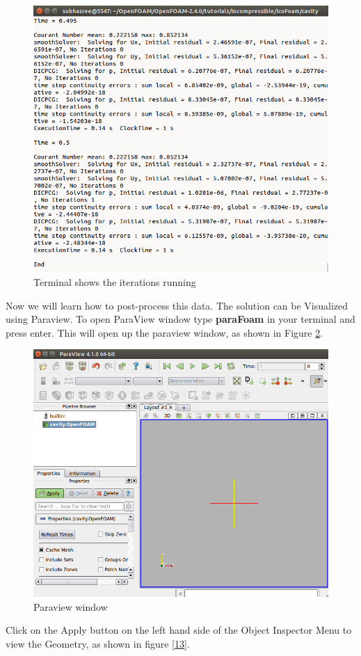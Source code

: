 \documentclass[a4paper,12pt]{report}
\begin{document}
\begin{figure}[ht]  
\begin{center}  
\includegraphics[scale=0.3]{11.png}
\caption{Terminal shows the iterations running}
\label{11}
\end{center}  
\end{figure}
\flushleft Now we will learn how to post-process this data. The solution can be Visualized using Paraview. To open ParaView window type \textbf{paraFoam} in your terminal and press enter. This will open up the paraview window, as shown in Figure \ref{12}.
\vspace{5cm}
\begin{figure}[ht]  
\begin{center}  
\includegraphics[scale=0.32]{12.png}
\caption{Paraview window}
\label{12}
\end{center}  
\end{figure}
\flushleft Click on the Apply button on the left hand side of the Object Inspector Menu to view the Geometry, as shown in figure \ref{13}.
\end{document}
